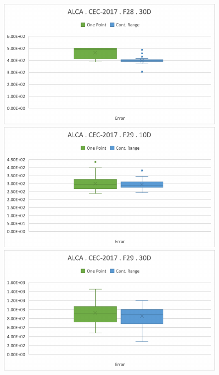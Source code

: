 \documentclass[graybox]{svmult}
\begin{document}
\begin{figure}[!ht]
\begin{minipage}[h]{0.49\linewidth}
        \end{minipage}
        \hfill
        \begin{minipage}[h]{0.49\linewidth}
            \includegraphics[width=1\linewidth]{img/fig_experiment_F28x30D.pdf} 
        \end{minipage}
        \vfill
        \vspace{0.05 cm}
        \begin{minipage}[h]{0.49\linewidth}
            \includegraphics[width=1\linewidth]{img/fig_experiment_F29x10D.pdf} 
        \end{minipage}
        \hfill
        \begin{minipage}[h]{0.49\linewidth}
            \includegraphics[width=1\linewidth]{img/fig_experiment_F29x30D.pdf} 

\end{minipage}
\end{figure}
\end{document}
